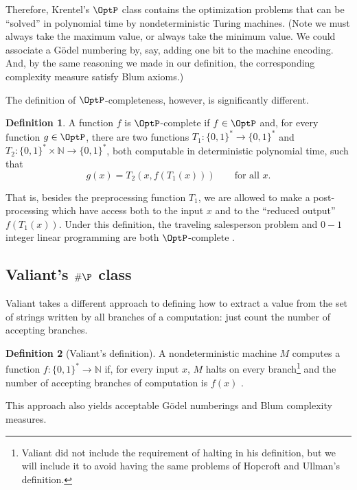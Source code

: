 \documentclass[12pt]{article}
\theoremstyle{definition}
\newtheorem{definition}{Definition}
\begin{document}
Therefore, Krentel's $\OptP$ class contains the optimization problems
that can be ``solved'' in polynomial time by nondeterministic Turing machines.
(Note we must always take the maximum value, or always take the minimum value.
We could associate a Gödel numbering by, say,
adding one bit to the machine encoding.
And, by the same reasoning we made in our definition,
the corresponding complexity measure satisfy Blum axioms.)

The definition of $\OptP$-completeness, however,
is significantly different.

\begin{definition}
    A function $f$ is $\OptP$-complete if $f \in \OptP$ and,
    for every function $g \in \OptP$,
    there are two functions $T_1 : \{0, 1\}^* \to \{0, 1\}^*$
    and $T_2 : \{0, 1\}^* \times \mathbb N \to \{0, 1\}^*$,
    both computable in deterministic polynomial time,
    such that
    \begin{equation*}
        g(x) = T_2( x, f(T_1(x)) ) \qquad \text{for all $x$.}
    \end{equation*}
\end{definition}

That is, besides the preprocessing function $T_1$,
we are allowed to make a post-processing which have access
both to the input $x$ and to the ``reduced output'' $f(T_1(x))$.
Under this definition,
the traveling salesperson problem and $0-1$ integer linear programming
are both $\OptP$-complete \cite[p~495]{Krentel1988}.

\subsection{Valiant's $\#\P$ class}
\label{sec:valiant}

Valiant takes a different approach to defining how to extract a value
from the set of strings written by all branches of a computation:
just count the number of accepting branches.

\begin{definition}[Valiant's definition]
    A nondeterministic machine $M$ computes a function $f: \{0, 1\}^* \to \mathbb N$ if,
    for every input $x$,
    $M$ halts on every branch\footnote{
        Valiant did not include the requirement of halting in his definition,
        but we will include it to avoid having the same problems
        of Hopcroft and Ullman's definition.
    }
    and the number of accepting branches of computation is $f(x)$
    \cite[p.~191]{Valiant1979}.
\end{definition}
This approach also yields acceptable Gödel numberings and Blum complexity measures.
\end{document}
